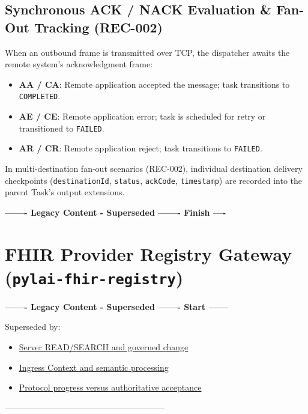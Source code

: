 \subsection{Synchronous ACK / NACK Evaluation \& Fan-Out Tracking (REC-002)}
When an outbound frame is transmitted over TCP, the dispatcher awaits the remote system's acknowledgment frame:
\begin{itemize}
    \item \textbf{AA / CA}: Remote application accepted the message; task transitions to \texttt{COMPLETED}.
    \item \textbf{AE / CE}: Remote application error; task is scheduled for retry or transitioned to \texttt{FAILED}.
    \item \textbf{AR / CR}: Remote application reject; task transitions to \texttt{FAILED}.
\end{itemize}
In multi-destination fan-out scenarios (REC-002), individual destination delivery checkpoints (\nolinkurl{destinationId}, \nolinkurl{status}, \nolinkurl{ackCode}, \nolinkurl{timestamp}) are recorded into the parent Task's output extensions.


\par\noindent\textbf{------- Legacy Content - Superseded ------- Finish ----}

\section{FHIR Provider Registry Gateway (\texttt{pylai-fhir-registry})}

\par\noindent\textbf{------- Legacy Content - Superseded ------- Start ------}
\par\noindent Superseded by:
\begin{itemize}
  \item \href{../../markdown/05-information-systems-architecture/pylai-external-interoperability.md\#pylai-server-controller}{Server READ/SEARCH and governed change}
  \item \href{../../markdown/05-information-systems-architecture/pylai-external-interoperability.md\#pylai-pathway-ingress}{Ingress Context and semantic processing}
  \item \href{../../markdown/05-information-systems-architecture/pylai-external-interoperability.md\#acceptance-and-acknowledgement}{Protocol progress versus authoritative acceptance}
\end{itemize}
\noindent ---------------------------------------------------------

